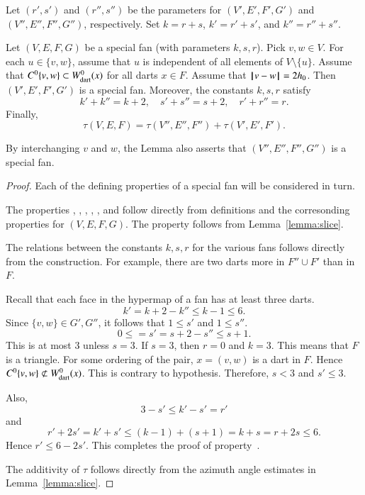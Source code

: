 Let $(r',s')$ and $(r'',s'')$ be the parameters for $(V',E',F',G')$ and $(V'',E'',F'',G'')$, respectively.
Set $k=r+s$, $k'=r'+s'$, and $k''=r''+s''$.

\begin{lemma}\guid{}\rating{}  Let $(V,E,F,G)$ be a special fan (with parameters $k,s,r$).  
Pick $v,w\in V$.  
For each $u\in \{v,w\}$, assume that $u$ is independent of all elements of $V\setminus\{u\}$.    Assume that $C^0\{v,w\}\subset W^0_{\text{dart}}(x)$ for all darts $x\in F$. Assume that ${\hskip0.1em|\hskip-0.15em|\hskip0.1em}v - w{\hskip0.1em|\hskip-0.15em|\hskip0.1em}=2{h_0}$.
Then $(V',E',F',G')$ is a special fan.  Moreover,
the constants $k,s,r$ satisfy
$$
k'+k'' = k + 2,\quad s'+s'' = s + 2,\quad r'+r''=r.
$$
Finally,
$$
\tau(V,E,F)= \tau(V'',E'',F'') +\tau(V',E',F').
$$
\end{lemma}

By interchanging $v$ and $w$, the Lemma also asserts that $(V'',E'',F'',G'')$ is a special fan.

\begin{proof}  Each of the defining properties of a special fan will be considered in turn.

The properties , , , , , and  follow directly from definitions and the corresonding properties for $(V,E,F,G)$.
The property  follows from Lemma~\ref{lemma:slice}.

The relations between the constants $k,s,r$ for the various fans follows directly from the construction.
For example, there are two darts more in $F''\cup F'$ than in $F$.  

  Recall that each face in the hypermap of a fan has at least three darts.
$$k' = k + 2 - k'' \le k-1\le 6.$$
Since $\{v,w\}\in G', G''$, it follows that $1\le s'$ and $1\le s''$.
$$0\le  = s' = s + 2 - s'' \le s+1.$$
This is at most $3$ unless $s=3$.   If $s=3$, then $r=0$ and $k=3$.  This means that $F$ is
a triangle.  For some ordering of the pair, $x=(v,w)$ is a dart in $F$.
Hence  $C^0\{v,w\} \not\subset W^0_{\text{dart}}(x)$.  This is contrary to hypothesis.  Therefore, $s<3$ and $s'\le 3$.

Also, $$3-s' \le k'-s' = r' $$
and
$$
r' + 2s'= k'+s'\le (k-1) + (s+1) =k+s = r + 2s \le 6.
$$
Hence $r' \le 6 - 2 s'$.  This completes the proof of property~.

The additivity of $\tau$ follows directly from the azimuth angle estimates in Lemma~\ref{lemma:slice}.
\end{proof}

